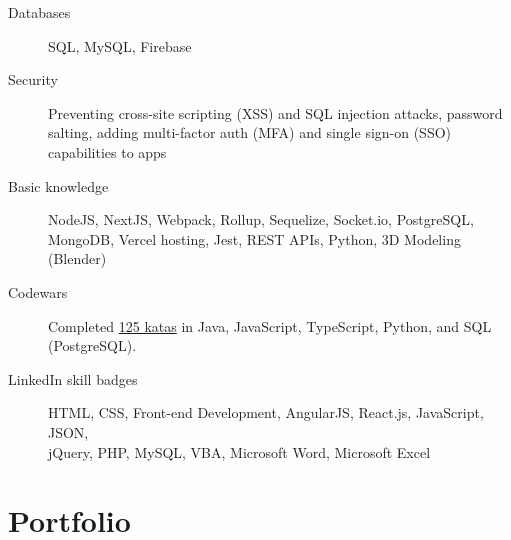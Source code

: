 \documentclass{article}
\begin{document}
\begin{description}
  \item [Databases] SQL, MySQL, Firebase
  \item [Security] Preventing cross-site scripting (XSS) and SQL injection attacks, password salting, adding multi-factor auth (MFA) and single sign-on (SSO) capabilities to apps
  \item [Basic knowledge] NodeJS, NextJS, Webpack, Rollup, Sequelize, Socket.io, PostgreSQL, MongoDB, Vercel hosting, Jest, REST APIs, Python, 3D Modeling (Blender)
  \item [Codewars] Completed \href{https://www.codewars.com/users/sirkoik}{125 katas} in Java, JavaScript, TypeScript, Python, and SQL (PostgreSQL).
  \item [LinkedIn skill badges] HTML, CSS, Front-end Development, AngularJS, React.js, JavaScript, JSON,\\ jQuery, PHP, MySQL, VBA, Microsoft Word, Microsoft Excel
\end{description}

\vspace{-0.5em}
\section*{Portfolio}\vspace{-0.5em}
\end{document}
